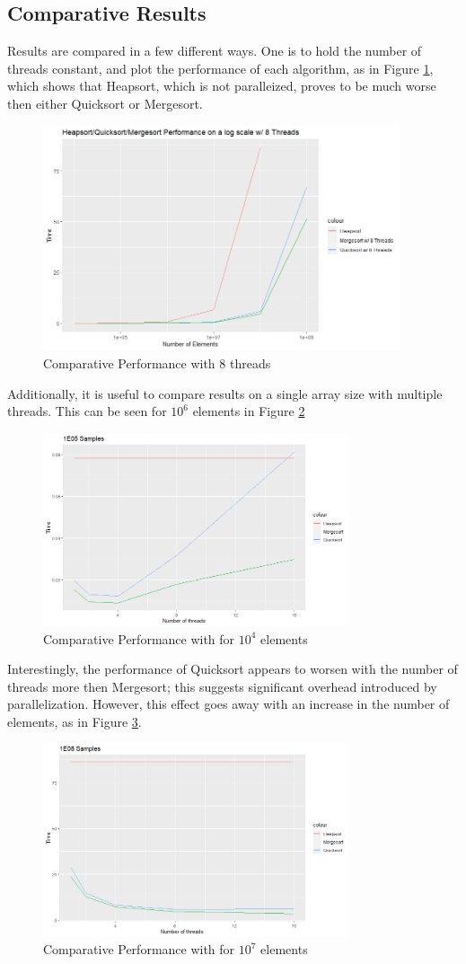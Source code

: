 \documentclass[conference]{IEEEtran}
\begin{document}
\subsection{Comparative Results}
Results are compared in a few different ways. 
One is to hold the number of threads constant, and plot the performance of each algorithm, as in Figure \ref{msqshs}, which shows that Heapsort, which is not paralleized, proves to be much worse then either Quicksort or Mergesort.
\begin{figure}
	\includegraphics[width=10.5cm]{mshsqs.png} 
	\caption{Comparative Performance with 8 threads}
	\label{msqshs}
\end{figure}
Additionally, it is useful to compare results on a single array size with multiple threads. 
This can be seen for $10^6$ elements in Figure \ref{1e5}
\begin{figure}[h]
	\includegraphics[width=9cm]{1e5.png} 
	\caption{Comparative Performance with for $10^4$ elements}
	\label{1e5}
\end{figure}
Interestingly, the performance of Quicksort appears to worsen with the number of threads more then Mergesort; this suggests significant overhead introduced by parallelization. 
However, this effect goes away with an increase in the number of elements, as in Figure \ref{1e8}. 
\begin{figure}[h]
	\includegraphics[width=9cm]{1e8.png} 
	\caption{Comparative Performance with for $10^7$ elements}
	\label{1e8}
\end{figure}
\end{document}
